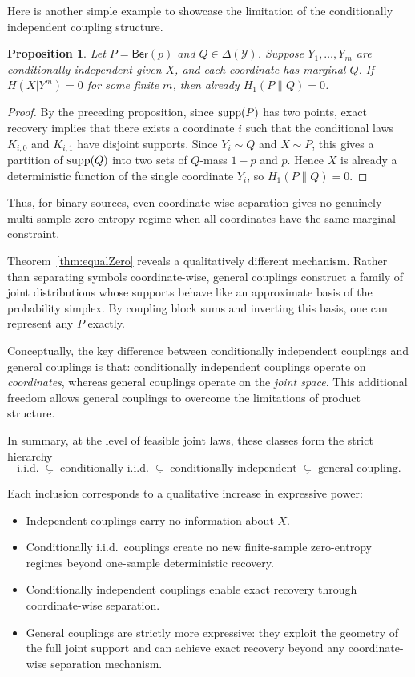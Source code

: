 \documentclass[journal]{IEEEtran}
\newtheorem{proposition}{Proposition}
\def\supp{\mathop{\rm supp}}
\newcommand{\1}{\mathbf{1}}
\newcommand{\Ber}{\mathsf{Ber}}
\begin{document}
\begin{description}
Here is another simple example to showcase the limitation of the conditionally independent coupling structure. 
\begin{proposition}
Let $P=\Ber(p)$ and $Q\in\Delta(\mathcal Y)$. Suppose
$Y_1,\ldots,Y_m$ are conditionally independent given $X$, and each coordinate
has marginal $Q$. If $H(X| Y^m)=0$ for some finite $m$, then already
$H_1(P\|Q)=0$.
\end{proposition}
\begin{proof}
By the preceding proposition, since $\supp(P)$ has two points, exact recovery implies that there exists a coordinate $i$ such that the conditional laws $K_{i,0}$ and $K_{i,1}$ have disjoint supports. Since $Y_i\sim Q$ and $X\sim P$, this gives a partition of $\supp(Q)$ into two sets of $Q$-mass $1-p$ and $p$. Hence $X$ is already a deterministic function of the single coordinate $Y_i$, so $H_1(P\|Q)=0$.
\end{proof}
Thus, for binary sources, even coordinate-wise separation gives no genuinely
multi-sample zero-entropy regime when all coordinates have the same marginal
constraint.



\item[General coupling:] Theorem~\ref{thm:equalZero} reveals a qualitatively different mechanism. Rather than separating symbols coordinate-wise, general couplings construct a family of joint distributions whose supports behave like an approximate basis of the probability simplex. By coupling block sums and inverting this basis, one can represent any $P$ exactly. 

Conceptually, the key difference between conditionally independent couplings and general couplings is that:  conditionally independent couplings operate on \emph{coordinates}, whereas general couplings operate on the \emph{joint space}. This additional freedom allows general couplings to overcome the limitations of product structure.
\end{description}

In summary, at the level of feasible joint laws, these classes form the strict hierarchy
$$
\text{i.i.d.}
\;\subsetneq\;
\text{conditionally i.i.d.}
\;\subsetneq\;
\text{conditionally independent}
\;\subsetneq\;
\text{general coupling}.
$$

\noindent
Each inclusion corresponds to a qualitative increase in expressive power:
\begin{itemize}
    \item Independent couplings carry no information about $X$.
    \item Conditionally i.i.d.\ couplings create no new finite-sample
    zero-entropy regimes beyond one-sample deterministic recovery.
    \item Conditionally independent couplings enable exact recovery through
    coordinate-wise separation.
    \item General couplings are strictly more expressive: they exploit the
    geometry of the full joint support and can achieve exact recovery beyond
    any coordinate-wise separation mechanism.
\end{itemize}
\end{document}
